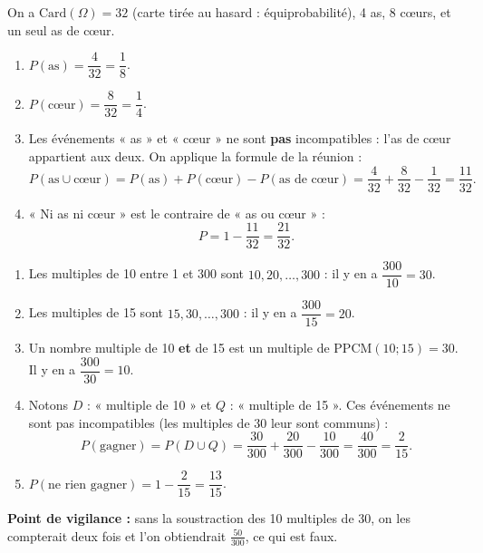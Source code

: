 \documentclass[11pt]{article}
\begin{document}
\begin{corrige}
On a $\text{Card}(\Omega) = 32$ (carte tirée au hasard : équiprobabilité), 4 as, 8 cœurs, et un seul as de cœur.
\begin{enumerate}
\item $P(\text{as}) = \dfrac{4}{32} = \dfrac{1}{8}$.
\item $P(\text{cœur}) = \dfrac{8}{32} = \dfrac{1}{4}$.
\item Les événements « as » et « cœur » ne sont \textbf{pas} incompatibles : l'as de cœur appartient aux deux. On applique la formule de la réunion :
\[P(\text{as} \cup \text{cœur}) = P(\text{as}) + P(\text{cœur}) - P(\text{as de cœur}) = \frac{4}{32} + \frac{8}{32} - \frac{1}{32} = \frac{11}{32}.\]
\item « Ni as ni cœur » est le contraire de « as ou cœur » :
\[P = 1 - \frac{11}{32} = \frac{21}{32}.\]
\end{enumerate}
\end{corrige}

\begin{corrige}
\begin{enumerate}
\item Les multiples de 10 entre 1 et 300 sont $10, 20, \dots, 300$ : il y en a $\dfrac{300}{10} = 30$.
\item Les multiples de 15 sont $15, 30, \dots, 300$ : il y en a $\dfrac{300}{15} = 20$.
\item Un nombre multiple de 10 \textbf{et} de 15 est un multiple de $\text{PPCM}(10 ; 15) = 30$. Il y en a $\dfrac{300}{30} = 10$.
\item Notons $D$ : « multiple de 10 » et $Q$ : « multiple de 15 ». Ces événements ne sont pas incompatibles (les multiples de 30 leur sont communs) :
\[P(\text{gagner}) = P(D \cup Q) = \frac{30}{300} + \frac{20}{300} - \frac{10}{300} = \frac{40}{300} = \frac{2}{15}.\]
\item $P(\text{ne rien gagner}) = 1 - \dfrac{2}{15} = \dfrac{13}{15}$.
\end{enumerate}
\textbf{Point de vigilance :} sans la soustraction des 10 multiples de 30, on les compterait deux fois et l'on obtiendrait $\frac{50}{300}$, ce qui est faux.
\end{corrige}
\end{document}
